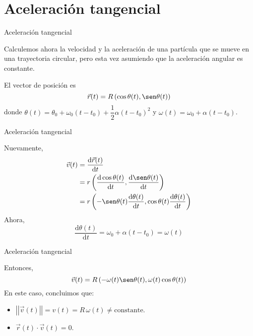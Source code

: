 \documentclass[11pt,handout,aspectratio=1610]{beamer}
\newcommand{\fdiff}[2]{\dfrac{\text{d} #1}{\text{d} #2}}
\newcommand{\norm}[1]{\left\vert\left\vert #1 \right\vert\right\vert}
\begin{document}
\section{Aceleración tangencial}

\begin{frame}{Aceleración tangencial}

Calculemos ahora la velocidad y la aceleración de una partícula que se mueve en una trayectoria circular, pero esta vez asumiendo que la aceleración angular es constante. \pause 

\vspace{0.3cm}

El vector de posición es $$\vec{r} (t) = R \left(\cos \theta (t) , \sen \theta (t)\right)$$ donde $\theta (t) = \theta_0 + \omega_0 \left(t-t_0\right) + \dfrac{1}{2} \alpha \left(t-t_0\right)^2$ y $\omega (t) = \omega_0 + \alpha \left(t-t_0\right)$.

\end{frame}

\begin{frame}{Aceleración tangencial}

Nuevamente,
\begin{equation*}
    \begin{split}
        \vec{v} (t) &= \fdiff{\vec{r} (t)}{t} \\
                    &= r \left(\fdiff{\cos \theta (t)}{t}, \fdiff{\sen \theta (t)}{t}\right) \\
                    &= r \left(- \sen \theta (t) \fdiff{\theta (t)}{t}, \cos \theta (t) \fdiff{\theta (t)}{t}\right)
    \end{split}
\end{equation*} \pause Ahora, $$\fdiff{\theta (t)}{t} = \omega_0 + \alpha \left(t-t_0\right) = \omega (t)$$

\end{frame}

\begin{frame}{Aceleración tangencial}

Entonces, $$\vec{v} (t) = R \left(- \omega(t) \sen \theta (t), \omega(t) \cos \theta (t)\right)$$ \pause En este caso, concluimos que:
\begin{itemize}
    \item $\norm{\vec{v} (t)} = v(t) = R \, \omega(t) \neq \text{constante}$. \pause
    \item $\vec{r} (t) \cdot \vec{v} (t) = 0$.
\end{itemize}

\end{frame}
\end{document}
